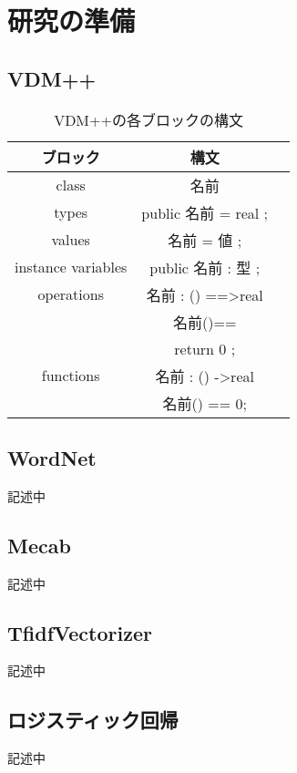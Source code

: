 \chapter{研究の準備}\label{cha:Preparation}
\section{VDM++}
\label{sec:vdm}

\begin{table}[t]
    \begin{center}      
        \caption{VDM++の各ブロックの構文}\label{table:vdm_syntax}
        \begin{tabular}{c|c|c}
        ブロック  & 構文　\\ \hline \hline
        class & 名前 \\ \hline
        types	 & public 名前 = real ;\\ \hline
        values  & 名前 = 値 ;\\ \hline
        instance variables & public 名前 : 型 ;\\ \hline
        operations & 名前 : () ==\textgreater real\\
                   & 名前()==\\
                   & return 0 ;\\ \hline 
        functions  & 名前 : () -\textgreater real \\
                   & 名前() == 0; \\ \hline 
        \end{tabular}
    \end{center}
\end{table}

\section{WordNet}
\label{sec:wordNet}
記述中

\section{Mecab}
\label{sec:mecab}
記述中

\section{TfidfVectorizer}
\label{sec:tfidf}
記述中

\section{ロジスティック回帰}
\label{sec:logistic}
記述中